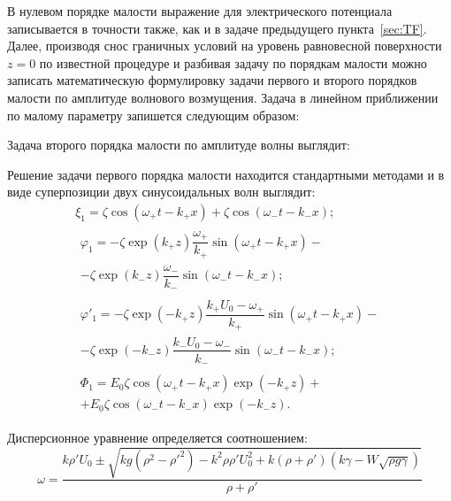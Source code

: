 В нулевом порядке малости выражение для электрического потенциала записывается в точности также, как и в задаче предыдущего пункта~\ref{sec:TF}. Далее, производя снос граничных условий на уровень равновесной поверхности $ z=0 $  по известной процедуре и разбивая задачу по порядкам малости можно записать математическую формулировку задачи первого и второго порядков малости по амплитуде волнового возмущения. Задача в линейном приближении по малому параметру запишется следующим образом:

Задача второго порядка малости по амплитуде волны выглядит:

 

Решение задачи первого порядка малости  находится стандартными методами и в виде суперпозиции двух синусоидальных волн выглядит:
\begin{gather}
\xi_{1}=\zeta \cos \left( \omega_{+} t - k_{+}x \right)+\zeta \cos \left( \omega_{-} t - k_{-}x \right); \label{Xi1TFKHWP}\\
\begin{gathered}
\varphi_{1}=-\zeta \exp \left( k_{+} z \right) \dfrac{\omega_{+}}{k_{+}}\sin \left( \omega_{+} t - k_{+}x \right)-\\
-\zeta \exp \left( k_{-} z \right) \dfrac{\omega_{-}}{k_{-}}\sin \left( \omega_{-} t - k_{-}x \right); \label{phi1TFKHWP}
\end{gathered}
\\ 
\begin{gathered}
\varphi'_{1}=-\zeta \exp \left( -k_{+} z \right) \dfrac{k_{+}U_{0}-\omega_{+}}{k_{+}}\sin \left( \omega_{+} t - k_{+}x \right)-\\
-\zeta \exp \left( -k_{-} z \right) \dfrac{k_{-}U_{0}-\omega_{-}}{k_{-}}\sin \left( \omega_{-} t - k_{-}x \right); \label{phi'1TFKHWP}
\end{gathered}\\ 
\begin{gathered}
\Phi_{1}=E_{0}\zeta \cos \left( \omega_{+} t - k_{+}x \right) \exp \left( -k_{+} z \right) +\\
+E_{0}\zeta \cos \left( \omega_{-} t - k_{-}x \right) \exp \left( -k_{-} z \right).
\label{Phi1TFKHWP} 
\end{gathered}
\end{gather}
	  	
Дисперсионное уравнение определяется соотношением:
\begin{equation}
\omega = \dfrac{k \rho' U_{0}\pm \sqrt{k g \left(\rho^{2} - \rho'^{2} \right) -k^{2} \rho \rho' U_{0}^{2} + k \left( \rho + \rho' \right) \left( k \gamma - W \sqrt{\rho g \gamma} \right)}}{\rho + \rho'}
\label{DUTFKHWP}
\end{equation}
	  	
